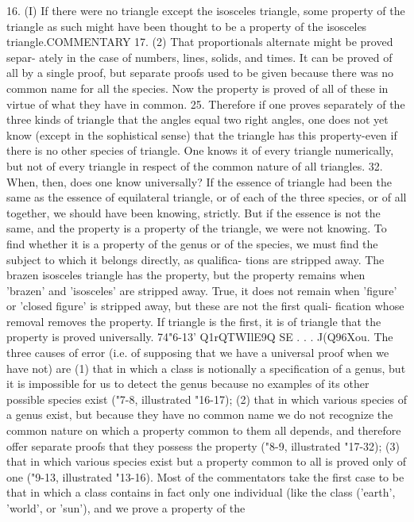 {{{{{{16. (I) If there were no triangle except the isosceles triangle,
some property of the triangle as such might have been thought
to be a property of the isosceles triangle.COMMENTARY
17. (2) That proportionals alternate might be proved separ-
ately in the case of numbers, lines, solids, and times. It can be
proved of all by a single proof, but separate proofs used to be
given because there was no common name for all the species.
Now the property is proved of all of these in virtue of what they
have in common.
25. Therefore if one proves separately of the three kinds of
triangle that the angles equal two right angles, one does not yet
know (except in the sophistical sense) that the triangle has this
property-even if there is no other species of triangle. One knows
it of every triangle numerically, but not of every triangle in
respect of the common nature of all triangles.
32. When, then, does one know universally? If the essence of
triangle had been the same as the essence of equilateral triangle,
or of each of the three species, or of all together, we should have
been knowing, strictly. But if the essence is not the same, and
the property is a property of the triangle, we were not knowing.
To find whether it is a property of the genus or of the species, we
must find the subject to which it belongs directly, as qualifica-
tions are stripped away. The brazen isosceles triangle has the
property, but the property remains when 'brazen' and 'isosceles'
are stripped away. True, it does not remain when 'figure' or
'closed figure' is stripped away, but these are not the first quali-
fication whose removal removes the property. If triangle is the
first, it is of triangle that the property is proved universally.
74"6-13' Q1rQTWIlE9Q SE . . . J(Q96Xou. The three causes of
error (i.e. of supposing that we have a universal proof when we
have not) are (1) that in which a class is notionally a specification
of a genus, but it is impossible for us to detect the genus because
no examples of its other possible species exist ("7-8, illustrated
"16-17); (2) that in which various species of a genus exist, but
because they have no common name we do not recognize the
common nature on which a property common to them all depends,
and therefore offer separate proofs that they possess the property
("8-9, illustrated "17-32); (3) that in which various species exist
but a property common to all is proved only of one ("9-13,
illustrated "13-16).
Most of the commentators take the first case to be that in
which a class contains in fact only one individual (like the class
('earth', 'world', or 'sun'), and we prove a property of the
}}}}}}
